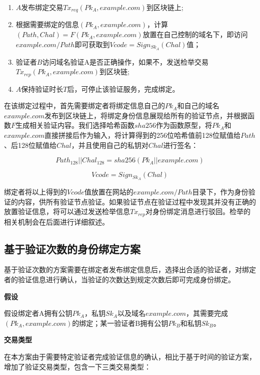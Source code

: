 \begin{enumerate}
	\item $A$发布绑定交易$Tx_{req}(Pk_A, example.com)$到区块链上;
	\item 根据需要绑定的信息$(Pk_A, example.com)$，计算$(Path, Chal) = F(Pk_A, example.com)$放置在自己控制的域名下，即访问$example.com/Path$即可获取到$Vcode = Sign_{Sk_A}(Chal)$值；
	\item 验证者$B$访问域名验证A是否正确操作，如果不，发送检举交易$Tx_{rep}(Pk_A, example.com)$到区块链;
	\item $A$保持验证时长$T$后，可停止该验证服务，完成绑定。
\end{enumerate}

在该绑定过程中，首先需要绑定者将绑定信息自己的$Pk_A$和自己的域名$example.com$发布到区块链上，将绑定身份信息展现给所有的验证节点，并根据函数$F$生成相关验证内容。我们选择哈希函数$sha256$作为函数原型，将$Pk_A$和$example.com$直接拼接后作为输入，将计算得到的256位哈希值前128位赋值给$Path$、后128位赋值给$Chal$，并且使用自己的私钥对$Chal$进行签名：

\begin{equation}\label{eqF}
Path_{128}||Chal_{128} = sha256(Pk_A||example.com)
\end{equation}

\begin{equation}\label{eqSign}
Vcode = Sign_{Sk_A}(Chal)
\end{equation}

绑定者将以上得到的$Vcode$值放置在网站的$example.com/Path$目录下，作为身份验证的内容，供所有验证节点验证。如果验证节点在验证过程中发现其并没有正确的放置验证信息，将可以通过发送检举信息$Tx_{rep}$对身份绑定消息进行驳回。检举的相关机制会在后面进行详细叙述。


\subsection{基于验证次数的身份绑定方案}\label{ver_num}

基于验证次数的方案需要在绑定者发布绑定信息后，选择出合适的验证者，对绑定者的验证信息进行确认，当验证的次数达到规定次数后即可完成身份绑定。

\noindent\textbf{假设}

假设绑定者A拥有公钥$Pk_A$，私钥$Sk_A$以及域名$example.com$，其需要完成$(Pk_A, example.com)$的绑定；某一验证者B拥有公钥$Pk_B$和私钥$Sk_B$。

\noindent\textbf{交易类型}

在本方案由于需要特定验证者完成验证信息的确认，相比于基于时间的验证方案，增加了验证交易类型，包含一下三类交易类型：


